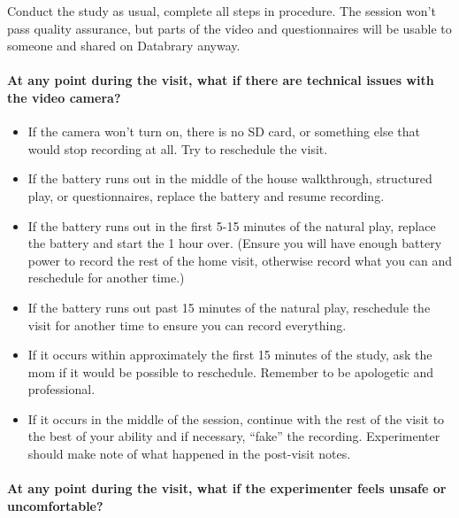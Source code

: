 \documentclass[
  12pt,
]{book}
\providecommand{\tightlist}{%
  \setlength{\itemsep}{0pt}\setlength{\parskip}{0pt}}
\begin{document}
Conduct the study as usual, complete all steps in procedure. The session won't pass quality assurance, but parts of the video and questionnaires will be usable to someone and shared on Databrary anyway.

\hypertarget{at-any-point-during-the-visit-what-if-there-are-technical-issues-with-the-video-camera}{%
\paragraph*{At any point during the visit, what if there are technical issues with the video camera?}\label{at-any-point-during-the-visit-what-if-there-are-technical-issues-with-the-video-camera}}

\begin{itemize}
\tightlist
\item
  If the camera won't turn on, there is no SD card, or something else that would stop recording at all. Try to reschedule the visit.
\item
  If the battery runs out in the middle of the house walkthrough, structured play, or questionnaires, replace the battery and resume recording.
\item
  If the battery runs out in the first 5-15 minutes of the natural play, replace the battery and start the 1 hour over. (Ensure you will have enough battery power to record the rest of the home visit, otherwise record what you can and reschedule for another time.)
\item
  If the battery runs out past 15 minutes of the natural play, reschedule the visit for another time to ensure you can record everything.
\item
  If it occurs within approximately the first 15 minutes of the study, ask the mom if it would be possible to reschedule. Remember to be apologetic and professional.\\
\item
  If it occurs in the middle of the session, continue with the rest of the visit to the best of your ability and if necessary, ``fake'' the recording. Experimenter should make note of what happened in the post-visit notes.
\end{itemize}

\hypertarget{at-any-point-during-the-visit-what-if-the-experimenter-feels-unsafe-or-uncomfortable}{%
\paragraph*{At any point during the visit, what if the experimenter feels unsafe or uncomfortable?}\label{at-any-point-during-the-visit-what-if-the-experimenter-feels-unsafe-or-uncomfortable}}
\end{document}
